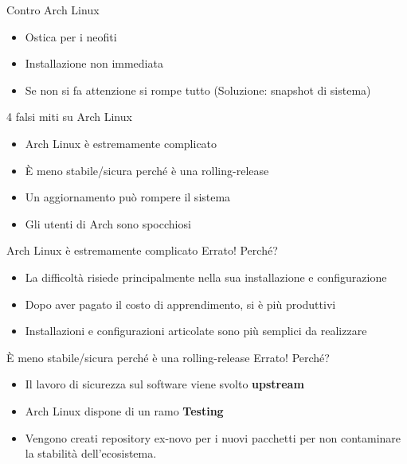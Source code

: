 
\begin{frame}{Contro Arch Linux}
    \begin{itemize}
        \item Ostica per i neofiti
        \item Installazione non immediata
        \item Se non si fa attenzione si rompe tutto (Soluzione: snapshot di sistema)
    \end{itemize}
\end{frame}


\begin{frame}{4 falsi miti su Arch Linux}
    \begin{itemize}
        \item Arch Linux è estremamente complicato
        \item È meno stabile/sicura perché è una rolling-release
        \item Un aggiornamento può rompere il sistema
        \item Gli utenti di Arch sono spocchiosi
    \end{itemize}
\end{frame}


\begin{frame}{Arch Linux è estremamente complicato}
    \alert{Errato!} Perché?
    \begin{itemize}
        \item La difficoltà risiede principalmente nella sua installazione e configurazione
        \item Dopo aver pagato il costo di apprendimento, si è più produttivi
        \item Installazioni e configurazioni articolate sono più semplici da realizzare
        
    \end{itemize}
\end{frame}


\begin{frame}{È meno stabile/sicura perché è una rolling-release}
    \alert{Errato!} Perché?
    \begin{itemize}
        \item Il lavoro di sicurezza sul software viene svolto \textbf{upstream}
        \item Arch Linux dispone di un ramo \textbf{Testing}
        \item Vengono creati repository ex-novo per i nuovi pacchetti per non contaminare la stabilità dell'ecosistema.
    \end{itemize}
\end{frame}

